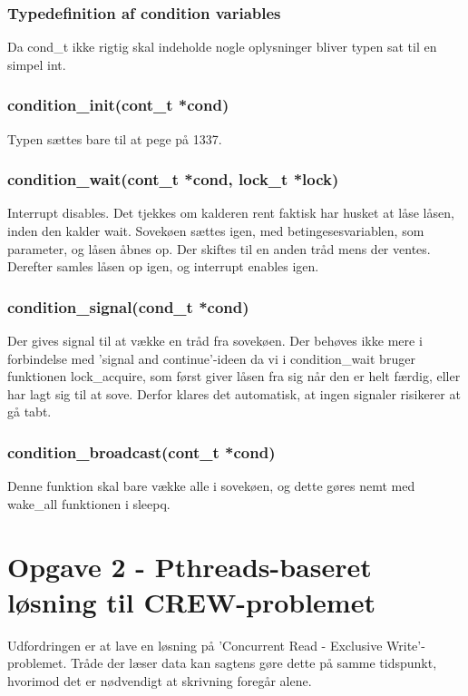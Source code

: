 \documentclass[10pt,a4paper,danish]{article}
\begin{document}
\subsubsection{Typedefinition af condition variables}
Da cond\_t ikke rigtig skal indeholde nogle oplysninger bliver typen sat til en simpel int.

\subsubsection{condition\_init(cont\_t *cond)}
Typen sættes bare til at pege på 1337.

\subsubsection{condition\_wait(cont\_t *cond, lock\_t *lock)}
Interrupt disables. Det tjekkes om kalderen rent faktisk har husket at låse låsen, inden den kalder wait. Sovekøen sættes igen, med betingesesvariablen, som parameter, og låsen åbnes op. Der skiftes til en anden tråd mens der ventes. Derefter samles låsen op igen, og interrupt enables igen.

\subsubsection{condition\_signal(cond\_t *cond)}
Der gives signal til at vække en tråd fra sovekøen. Der behøves ikke mere i forbindelse med 'signal and continue'-ideen da vi i condition\_wait bruger funktionen lock\_acquire, som først giver låsen fra sig når den er helt færdig, eller har lagt sig til at sove. Derfor klares det automatisk, at ingen signaler risikerer at gå tabt.

\subsubsection{condition\_broadcast(cont\_t *cond)}
Denne funktion skal bare vække alle i sovekøen, og dette gøres nemt med wake\_all funktionen i sleepq.

\section{Opgave 2 - Pthreads-baseret løsning til CREW-problemet}
Udfordringen er at lave en løsning på 'Concurrent Read - Exclusive Write'-problemet. Tråde der læser data kan sagtens gøre dette på samme tidspunkt, hvorimod det er nødvendigt at skrivning foregår alene.
\end{document}
